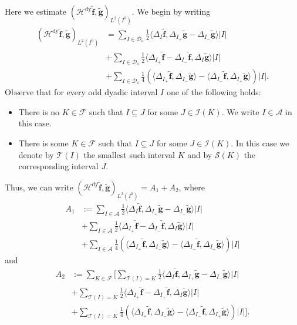 \documentclass{amsart}
\newcommand{\cD}{\mathcal{D}}
\newcommand{\wt}{\widetilde}
\theoremstyle{definition}
\theoremstyle{remark}
\begin{document}
Here we estimate $(\mathcal{H}^{\text{dy}}\wt{\mathbf{f}},\wt{\mathbf{g}})_{L^2(I^0)}$. We begin by writing
\begin{align}
    \label{eq:write_out_total_damage}
    (\mathcal{H}^{\mathrm{dy}}\wt{\mathbf{f}},\wt{\mathbf{g}})_{L^2(I^0)}&=\sum_{I\in\cD_{\mathrm{o}}}\frac{1}{2}\langle\Delta_{I}\wt{\mathbf{f}},\Delta_{I_{+}}\wt{\mathbf{g}}-\Delta_{I_{-}}\wt{\mathbf{g}}\rangle|I|\\
    \nonumber&+\sum_{I\in\cD_{\mathrm{o}}}\frac{1}{2}\langle\Delta_{I_{+}}\wt{\mathbf{f}}-\Delta_{I_{-}}\wt{\mathbf{f}},\Delta_{I}\wt{\mathbf{g}}\rangle|I|\\
    \nonumber&+\sum_{I\in\cD_{\mathrm{o}}}\frac{1}{4}(\langle\Delta_{I_{+}}\wt{\mathbf{f}},\Delta_{I_{-}}\wt{\mathbf{g}}\rangle-\langle\Delta_{I_{-}}\wt{\mathbf{f}},\Delta_{I_{+}}\wt{\mathbf{g}}\rangle)|I|.
\end{align}
Observe that for every odd dyadic interval $I$ one of the following holds:
\begin{itemize}
    \item[(a)] There is no $K\in\mathscr{F}$ such that $I\subseteq J$ for some $J\in\mathscr{I}(K)$. We write $I\in\mathscr{A}$ in this case.

    \item[(b)] There is some $K\in\mathscr{F}$ such that $I\subseteq J$ for some $J\in\mathscr{I}(K)$. In this case we denote by $\mathscr{T}(I)$ the smallest such interval $K$ and by $\mathscr{S}(K)$ the corresponding interval $J$.
\end{itemize}
Thus, we can write $(\mathcal{H}^{\mathrm{dy}}\wt{\mathbf{f}},\wt{\mathbf{g}})_{L^2(I^0)}=A_1+A_2$, where
\begin{align*}
    A_1&:=\sum_{I\in\mathscr{A}}\frac{1}{2}\langle\Delta_{I}\wt{\mathbf{f}},\Delta_{I_{+}}\wt{\mathbf{g}}-\Delta_{I_{-}}\wt{\mathbf{g}}\rangle|I|\\
    \nonumber&+\sum_{I\in\mathscr{A}}\frac{1}{2}\langle\Delta_{I_{+}}\wt{\mathbf{f}}-\Delta_{I_{-}}\wt{\mathbf{f}},\Delta_{I}\wt{\mathbf{g}}\rangle|I|\\
    \nonumber&+\sum_{I\in\mathscr{A}}\frac{1}{4}(\langle\Delta_{I_{+}}\wt{\mathbf{f}},\Delta_{I_{-}}\wt{\mathbf{g}}\rangle-\langle\Delta_{I_{-}}\wt{\mathbf{f}},\Delta_{I_{+}}\wt{\mathbf{g}}\rangle)|I|
\end{align*}
and
\begin{align*}
    A_2&:=\sum_{K\in\mathscr{F}}\bigg[\sum_{\mathscr{T}(I)=K}\frac{1}{2}\langle\Delta_{I}\wt{\mathbf{f}},\Delta_{I_{+}}\wt{\mathbf{g}}-\Delta_{I_{-}}\wt{\mathbf{g}}\rangle|I|\\
    \nonumber&+\sum_{\mathscr{T}(I)=K}\frac{1}{2}\langle\Delta_{I_{+}}\wt{\mathbf{f}}-\Delta_{I_{-}}\wt{\mathbf{f}},\Delta_{I}\wt{\mathbf{g}}\rangle|I|\\
    \nonumber&+\sum_{\mathscr{T}(I)=K}\frac{1}{4}(\langle\Delta_{I_{+}}\wt{\mathbf{f}},\Delta_{I_{-}}\wt{\mathbf{g}}\rangle-\langle\Delta_{I_{-}}\wt{\mathbf{f}},\Delta_{I_{+}}\wt{\mathbf{g}}\rangle)|I|\bigg].
\end{align*}
\end{document}
